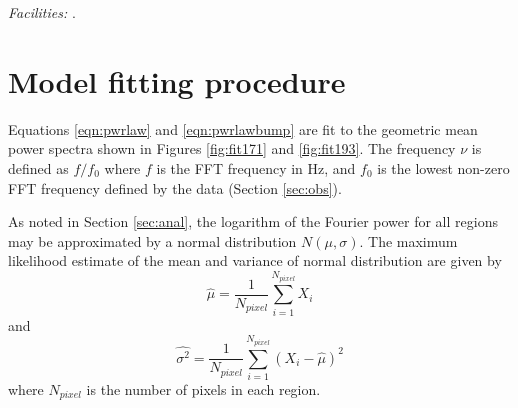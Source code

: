 \documentclass[preprint2]{aastex}
\begin{document}

{\it Facilities:} .



\appendix

\section{Model fitting procedure}\label{sec:app:ind}
Equations \ref{eqn:pwrlaw} and \ref{eqn:pwrlawbump} are fit to the
geometric mean power spectra shown in Figures \ref{fig:fit171} and
\ref{fig:fit193}.  The frequency $\nu$ is defined as $f/f_{0}$ where
$f$ is the FFT frequency in Hz, and $f_{0}$ is the lowest non-zero FFT
frequency defined by the data (Section \ref{sec:obs}).

As noted in Section \ref{sec:anal}, the logarithm of the Fourier power for all
regions may be approximated by a normal distribution $N(\mu, \sigma)$.
The maximum likelihood estimate of the mean and variance of normal
distribution are given by
\begin{equation}
\hat{\mu} = \frac{1}{N_{pixel}}\sum_{i=1}^{N_{pixel}}X_{i}
\label{eqn:mlmean}
\end{equation}
and
\begin{equation}
\hat{\sigma^{2}} = \frac{1}{N_{pixel}}\sum_{i=1}^{N_{pixel}}(X_{i}-\hat{\mu})^{2}
\label{eqn:sigmamean}
\end{equation}
where $N_{pixel}$ is the number of pixels in each region.
\end{document}
